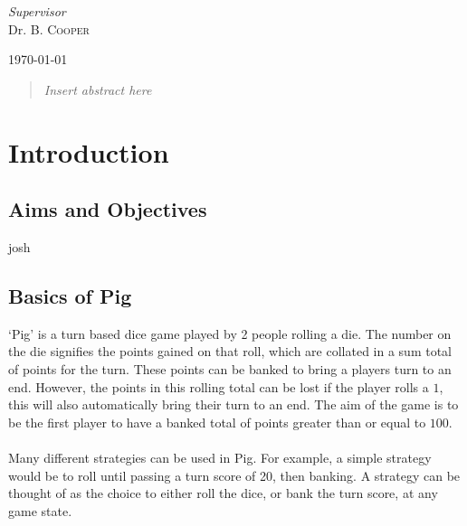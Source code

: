 \documentclass[a4paper,titlepage]{article}
\begin{document}
\begin{titlepage}
	\vfill\vfill
	\textit{Supervisor}\\
	Dr. B. \textsc{Cooper}


	\vfill\vfill\vfill

	{\large\today}
	\vfill


	\newpage
	\begin{abstract}
	\textit{Insert abstract here}
	\end{abstract}
\end{titlepage}


\tableofcontents
\newpage

\section{Introduction}

\subsection{Aims and Objectives}
josh

\subsection{Basics of Pig}
`Pig' is a turn based dice game played by 2 people rolling a die. The number on the die signifies the points gained on that roll,
which are collated in a sum total of points for the turn. These points can be banked to bring a players turn to an end.
However, the points in this rolling total can be lost if the player rolls a $1$, this will also automatically bring their turn to an end.
The aim of the game is to be the first player to have a banked total of points greater than or equal to $100$.
\\
\\
Many different strategies can be used in Pig. For example, a simple strategy would be to roll until passing a turn score of 20, then banking.
A strategy can be thought of as the choice to either roll the dice, or bank the turn score, at any game state.
\end{document}
